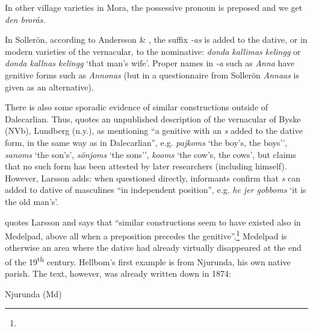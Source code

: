 \begin{styleBodyTextFirst}
In other village varieties in Mora, the possessive pronoun is preposed and we get \textit{den brorås.}

\end{styleBodyTextFirst}

\begin{styleBodytextC}
In Sollerön, according to Andersson \& \citet[357]{Danielsson1999}, the suffix\textit{ -a}\textit{s} is added to the dative, or in modern varieties of the vernacular, to the nominative: \textit{donda kallimas kelingg} or \textit{donda kallnas kelingg} ‘that man’s wife’. Proper names in\textit{ -a} such as \textit{Anna} have genitive forms such as \textit{Annonas }(but in a questionnaire from Sollerön \textit{Annaas} is given as an alternative).

\end{styleBodytextC}

\begin{styleBodytextC}
There is also some sporadic evidence of similar constructions outside of Dalecarlian. Thus, \citet[124]{Larsson1929} quotes an unpublished description of the vernacular of Byske (NVb), Lundberg (n.y.), as mentioning “a genitive with an \textit{s} added to the dative form, in the same way as in Dalecarlian”, e.g. \textit{pajkoms} ‘the boy’s, the boys’’, \textit{sanoms} ‘the son’s’, \textit{sönjoms} ‘the sons’’, \textit{kooms} ‘the cow’s, the cows’, but claims that no such form has been attested by later researchers (including himself). However, Larsson adds: when questioned directly, informants confirm that \textit{s} can added to dative of masculines “in independent position”, e.g. \textit{he jer gobboms} ‘it is the old man’s’. 

\end{styleBodytextC}

\begin{styleBodytextC}
\citet[126]{Hellbom1961} quotes Larsson and says that “similar constructions seem to have existed also in Medelpad, above all when a preposition precedes the genitive”.\footnote{} Medelpad is otherwise an area where the dative had already virtually disappeared at the end of the 19\textsuperscript{th} century. Hellbom’s first example is from Njurunda, his own native parish. The text, however, was already written down in 1874:

\end{styleBodytextC}

\begin{listWWNumileveli}
\item 

\begin{styleExample}
\label{bkm:Ref126396484}Njurunda (Md)

\end{styleExample}

\end{listWWNumileveli}


